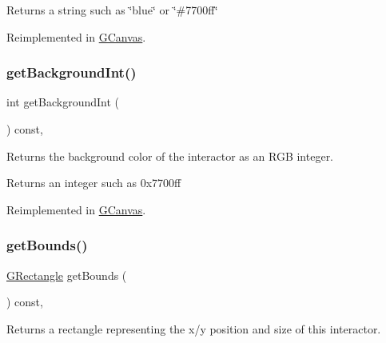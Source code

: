 \begin{DoxyReturn}{Returns}
a string such as \char`\"{}blue\char`\"{} or \char`\"{}\#7700ff\char`\"{} 
\end{DoxyReturn}


Reimplemented in \mbox{\hyperlink{classGCanvas_a4a62c51b7244a7642b88065e3a07ae82}{G\+Canvas}}.

\mbox{\label{classGInteractor_a9e827257a55cb8cf4d9de2ec6bcfd7a0}} 
\subsubsection{\texorpdfstring{get\+Background\+Int()}{getBackgroundInt()}}
{\footnotesize\ttfamily int get\+Background\+Int (\begin{DoxyParamCaption}{ }\end{DoxyParamCaption}) const\hspace{0.3cm}{\ttfamily [virtual]}, {\ttfamily [inherited]}}



Returns the background color of the interactor as an R\+GB integer. 

\begin{DoxyReturn}{Returns}
an integer such as 0x7700ff 
\end{DoxyReturn}


Reimplemented in \mbox{\hyperlink{classGCanvas_acd4f2b3b9619dacdfd71fc0004cac382}{G\+Canvas}}.

\mbox{\label{classGInteractor_a29e6ac35a0b48f491a4c88194cc5da3b}} 
\subsubsection{\texorpdfstring{get\+Bounds()}{getBounds()}}
{\footnotesize\ttfamily \mbox{\hyperlink{structGRectangle}{G\+Rectangle}} get\+Bounds (\begin{DoxyParamCaption}{ }\end{DoxyParamCaption}) const\hspace{0.3cm}{\ttfamily [virtual]}, {\ttfamily [inherited]}}



Returns a rectangle representing the x/y position and size of this interactor. 

